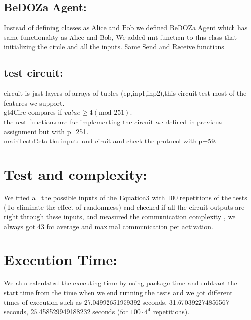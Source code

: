 \documentclass{article}
\begin{document}
\subsection*{BeDOZa Agent:}
Instead of defining classes as Alice and Bob we defined BeDOZa Agent which has same functionality as Alice and Bob, We added init function to this class that initializing the circle and all the inputs.
Same Send and Receive functions 
\subsection*{test circuit:} circuit is just layers of arrays of tuples (op,inp1,inp2),this circuit test most of the features we support.
\\gt4Circ compares if $value \geq 4 (\text{mod }251)$.
\\ the rest functions are for implementing the circuit we defined in previous assignment but with p=251.
\\{mainTest}:Gets the inputs and ciruit and check the protocol with p=59.
\section*{Test and complexity:}
We tried all the possible inputs of the Equation3 with 100 repetitions of the tests (To eliminate the effect of randomness) and checked if all the circuit outputs are right through these inputs, and measured the communication complexity , we always got 43 for average and maximal communication per activation.
\section*{Execution Time:}
We also calculated the executing time by using package time and subtract the start time from the time when we end running the tests and we got different times of execution such as 27.04992651939392 seconds, 31.670392274856567 seconds, 25.458529949188232 seconds (for $100 \cdot 4^4$ repetitions). 
\end{document}
